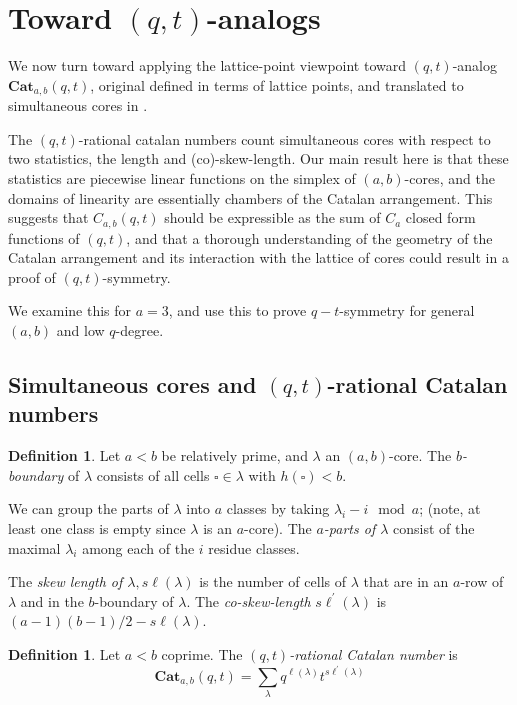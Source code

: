 \documentclass{amsart}[12pt]
\theoremstyle{definition}
\newtheorem{definition}[dummy]{Definition}
\newcommand{\Cat}{\mathbf{Cat}}
\newcommand{\sk}{s\ell}
\begin{document}
\section{Toward \texorpdfstring{$(q,t)$}{(q,t)}-analogs} \label{sec:qt}

We now turn toward applying the lattice-point viewpoint toward $(q,t)$-analog $\Cat_{a,b}(q,t)$, original defined in terms of lattice points, and translated to simultaneous cores in \cite{AHJ}.  

The $(q,t)$-rational catalan numbers count simultaneous cores with respect to two statistics, the length and (co)-skew-length.   Our main result here is that these statistics are piecewise linear functions on the simplex of $(a,b)$-cores, and the domains of linearity are essentially chambers of the Catalan arrangement. This suggests that $C_{a,b}(q,t)$ should be expressible as the sum of $C_a$ closed form functions of $(q,t)$, and that a thorough understanding of the geometry of the Catalan arrangement and its interaction with the lattice of cores could result in a proof of $(q,t)$-symmetry.

We examine this for $a=3$, and use this to prove $q-t$-symmetry for general $(a,b)$ and low $q$-degree.

\subsection{Simultaneous cores and \texorpdfstring{$(q,t)$}{(q,t)}-rational Catalan numbers}


\begin{definition}
Let $a<b$ be relatively prime, and $\lambda$ an $(a,b)$-core.  The                  \emph{$b$-boundary} of $\lambda$ consists of all cells $\square\in\lambda$ with $h(\square)<b$.

We can group the parts of $\lambda$ into $a$ classes by taking $\lambda_i-i\mod a$; (note, at least one class is empty since $\lambda$ is an $a$-core).  The \emph{$a$-parts of $\lambda$} consist of the maximal $\lambda_i$ among each of the $i$ residue classes.

The \emph{skew length of $\lambda, \sk(\lambda)$} is the number of cells of $\lambda$ that are in an $a$-row of $\lambda$ and in the $b$-boundary of $\lambda$. The \emph{co-skew-length} $\sk^\prime(\lambda)$ is $(a-1)(b-1)/2-\sk(\lambda)$.

\end{definition}


\begin{definition}
Let $a<b$ coprime.  The \emph{$(q,t)$-rational Catalan number} is
$$\Cat_{a,b}(q,t)=\sum_\lambda q^{\ell(\lambda)}t^{\sk^\prime(\lambda)}$$
\end{definition}
\end{document}
